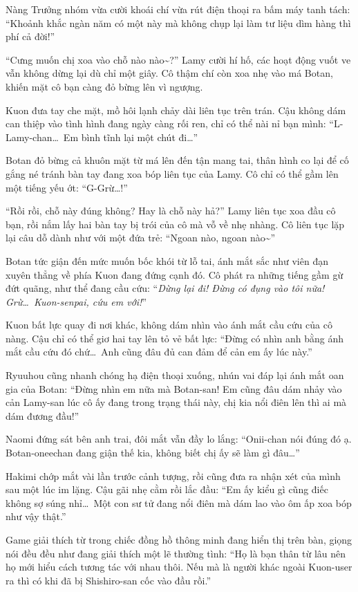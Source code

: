 \documentclass[../main.tex]{subfiles}
\begin{document}
Nàng Trưởng nhóm vừa cười khoái chí vừa rút điện thoại ra bấm máy tanh tách: ``Khoảnh khắc ngàn năm có một này mà không chụp lại làm tư liệu dìm hàng thì phí cả đời!''

``Cưng muốn chị xoa vào chỗ nào nào\~{}?'' Lamy cười hí hố, các hoạt động vuốt ve vẫn không dừng lại dù chỉ một giây. Cô thậm chí còn xoa nhẹ vào má Botan, khiến mặt cô bạn càng đỏ bừng lên vì ngượng.

Kuon đưa tay che mặt, mồ hôi lạnh chảy dài liên tục trên trán. Cậu không dám can thiệp vào tình hình đang ngày càng rối ren, chỉ có thể nài nỉ bạn mình: ``L-Lamy-chan\dots\ Em bình tĩnh lại một chút đi\dots''

Botan đỏ bừng cả khuôn mặt từ má lên đến tận mang tai, thân hình co lại để cố gắng né tránh bàn tay đang xoa bóp liên tục của Lamy. Cô chỉ có thể gầm lên một tiếng yếu ớt: ``G-Grừ\dots!''

``Rồi rồi, chỗ này đúng không? Hay là chỗ này hả?'' Lamy liên tục xoa đầu cô bạn, rồi nắm lấy hai bàn tay bị trói của cô mà vỗ về nhẹ nhàng. Cô liên tục lặp lại câu dỗ dành như với một đứa trẻ: ``Ngoan nào, ngoan nào\~{}''

Botan tức giận đến mức muốn bốc khói từ lỗ tai, ánh mắt sắc như viên đạn xuyên thẳng về phía Kuon đang đứng cạnh đó. Cô phát ra những tiếng gầm gừ đứt quãng, như thể đang cầu cứu: ``\textit{Dừng lại đi! Đừng có đụng vào tôi nữa! Grừ\dots\ Kuon-senpai, cứu em với!}''

Kuon bất lực quay đi nơi khác, không dám nhìn vào ánh mắt cầu cứu của cô nàng. Cậu chỉ có thể giơ hai tay lên tỏ vẻ bất lực: ``Đừng có nhìn anh bằng ánh mắt cầu cứu đó chứ\dots\ Anh cũng đâu đủ can đảm để cản em ấy lúc này.''

Ryuuhou cũng nhanh chóng hạ điện thoại xuống, nhún vai đáp lại ánh mắt oan gia của Botan: ``Đừng nhìn em nữa mà Botan-san! Em cũng đâu dám nhảy vào cản Lamy-san lúc cô ấy đang trong trạng thái này, chị kia nổi điên lên thì ai mà dám đương đầu!''

Naomi đứng sát bên anh trai, đôi mắt vẫn đầy lo lắng: ``Onii-chan nói đúng đó ạ. Botan-oneechan đang giận thế kia, không biết chị ấy sẽ làm gì đâu\dots''

Hakimi chớp mắt vài lần trước cảnh tượng, rồi cũng đưa ra nhận xét của mình sau một lúc im lặng. Cậu gãi nhẹ cằm rồi lắc đầu: ``Em ấy kiểu gì cũng điếc không sợ súng nhỉ\dots\ Một con sư tử đang nổi điên mà dám lao vào ôm ấp xoa bóp như vậy thật.''

Game giải thích từ trong chiếc đồng hồ thông minh đang hiển thị trên bàn, giọng nói đều đều như đang giải thích một lẽ thường tình: ``Họ là bạn thân từ lâu nên họ mới hiểu cách tương tác với nhau thôi. Nếu mà là người khác ngoài Kuon-user ra thì có khi đã bị Shishiro-san cốc vào đầu rồi.''
\end{document}
